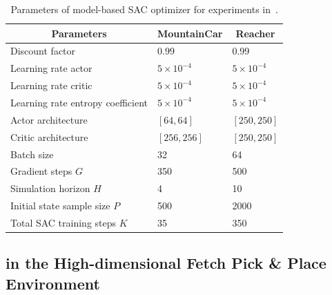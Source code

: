 \begin{table}[htb]
    \centering
    \caption{Parameters of model-based SAC optimizer for experiments in~.}
    \label{tab:sac_params}
\begin{tabular}{lll}
\midrule
\multicolumn{1}{c}{\textbf{Parameters}} & \multicolumn{1}{c}{\textbf{MountainCar}} & \multicolumn{1}{c}{\textbf{Reacher}} \\
\midrule
Discount factor                              & $0.99$                                     & $0.99$                                 \\
Learning rate actor                          & $5 \times 10^{-4}$                                     & $5 \times 10^{-4}$                               \\
Learning rate critic                         & $5 \times 10^{-4}$                                     & $5 \times 10^{-4}$                               \\
Learning rate entropy coefficient            & $5 \times 10^{-4}$                                     & $5 \times 10^{-4}$                                  \\
Actor architecture                           & $[64, 64]$                             & $[250, 250]$                       \\
Critic architecture                          & $[256, 256]$                           & $[250, 250]$                      \\
Batch size                                   & 32                                       & 64                                   \\
Gradient steps $G$                              & 350                                      & 500                                  \\
Simulation horizon   $H$                        & 4                                        & 10                                   \\
Initial state sample size   $P$                 & 500                                      & 2000                                 \\
Total SAC training steps      $K$               & 35                                       & 350         \\
\bottomrule
\end{tabular}
\end{table}

\subsection{\opacex in the High-dimensional Fetch Pick \& Place Environment} \label{subsec:fetch_pick}
